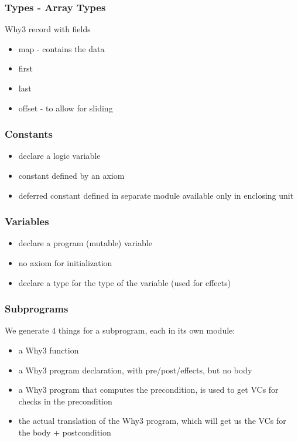 \documentclass{beamer}
\newenvironment{specialframe}{%
  \begin{frame}[fragile,environment=specialframe]}{\end{frame}}
\begin{document}
\begin{specialframe}\frametitle{Types - Array Types}
   \begin{block}{Why3 record with fields}
      \begin{itemize}
         \item map - contains the data
         \item first
         \item last
         \item offset - to allow for sliding
      \end{itemize}
   \end{block}
\end{specialframe}

\begin{specialframe}\frametitle{Constants}
   \begin{itemize}
      \item declare a logic variable
      \item constant defined by an axiom
      \item deferred constant defined in separate module available only in
        enclosing unit
   \end{itemize}
\end{specialframe}

\begin{specialframe}\frametitle{Variables}
   \begin{itemize}
      \item declare a program (mutable) variable
      \item no axiom for initialization
      \item declare a type for the type of the variable (used for effects)
   \end{itemize}
\end{specialframe}

\begin{specialframe}\frametitle{Subprograms}

We generate 4 things for a subprogram, each in its own module:
   \begin{itemize}
      \item a Why3 function
      \item a Why3 program declaration, with pre/post/effects, but no body
      \item a Why3 program that computes the precondition, is used to get VCs
for checks in the precondition
      \item the actual translation of the Why3 program, which will get us the
VCs for the body + postcondition
   \end{itemize}
\end{specialframe}
\end{document}
